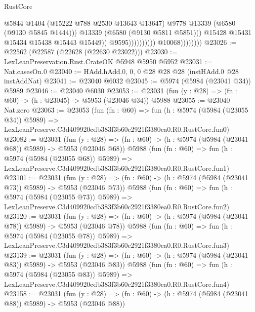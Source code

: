 \begin{lexlean}{RustCore}
\begin{coremodule}
                                                @5844
                                                @1404
                                                (@15222 @788 @2530 @13643 @13647)
                                                @9778
                                                @13339
                                                (@6580 (@9130 @5845 @1444)))
                                              @13339
                                              (@6580 (@9130 @5811 @5851)))
                                            @15428
                                            @15431
                                            @15434
                                            @15438
                                            @15443
                                            @15449))
                                        @9595))))))))))
                    @10068))))))))
@23026 := @22562 (@22587 (@22628 (@22630 @23022)))
@23030 := LexLeanPreservation.Rust.CrateOK @5948 @5950 @5952
@23031 := Nat.casesOn.{0}
@23040 := HAdd.hAdd.{0, 0, 0} @28 @28 @28 (instHAdd.{0} @28 instAddNat)
@23041 := @23040 @6032
@23045 := @5974 (@5984 (@23041 @34)) @5989
@23046 := @23040 @6030
@23053 := @23031 (fun (y : @28) => (fn : @60) -> (h : @23045) -> @5953 (@23046 @34)) @5988
@23055 := @23040 Nat.zero
@23063 := @23053
    (fun (fn : @60) =>
    fun (h : @5974 (@5984 (@23055 @34)) @5989) =>
    LexLeanPreserve.C3d409920cdb383f3b60c2921f3380ea0.R0.RustCore.fun0)
@23082 := @23031
    (fun (y : @28) => (fn : @60) -> (h : @5974 (@5984 (@23041 @68)) @5989) -> @5953 (@23046 @68))
    @5988
    (fun (fn : @60) =>
    fun (h : @5974 (@5984 (@23055 @68)) @5989) =>
    LexLeanPreserve.C3d409920cdb383f3b60c2921f3380ea0.R0.RustCore.fun1)
@23101 := @23031
    (fun (y : @28) => (fn : @60) -> (h : @5974 (@5984 (@23041 @73)) @5989) -> @5953 (@23046 @73))
    @5988
    (fun (fn : @60) =>
    fun (h : @5974 (@5984 (@23055 @73)) @5989) =>
    LexLeanPreserve.C3d409920cdb383f3b60c2921f3380ea0.R0.RustCore.fun2)
@23120 := @23031
    (fun (y : @28) => (fn : @60) -> (h : @5974 (@5984 (@23041 @78)) @5989) -> @5953 (@23046 @78))
    @5988
    (fun (fn : @60) =>
    fun (h : @5974 (@5984 (@23055 @78)) @5989) =>
    LexLeanPreserve.C3d409920cdb383f3b60c2921f3380ea0.R0.RustCore.fun3)
@23139 := @23031
    (fun (y : @28) => (fn : @60) -> (h : @5974 (@5984 (@23041 @83)) @5989) -> @5953 (@23046 @83))
    @5988
    (fun (fn : @60) =>
    fun (h : @5974 (@5984 (@23055 @83)) @5989) =>
    LexLeanPreserve.C3d409920cdb383f3b60c2921f3380ea0.R0.RustCore.fun4)
@23158 := @23031
    (fun (y : @28) => (fn : @60) -> (h : @5974 (@5984 (@23041 @88)) @5989) -> @5953 (@23046 @88))

\end{coremodule}
\end{lexlean}
